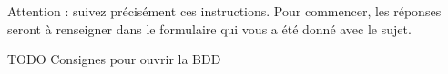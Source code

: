 Attention : suivez précisément ces instructions. Pour commencer, les réponses seront à renseigner dans le formulaire qui vous a été donné avec le sujet.

TODO Consignes pour ouvrir la BDD